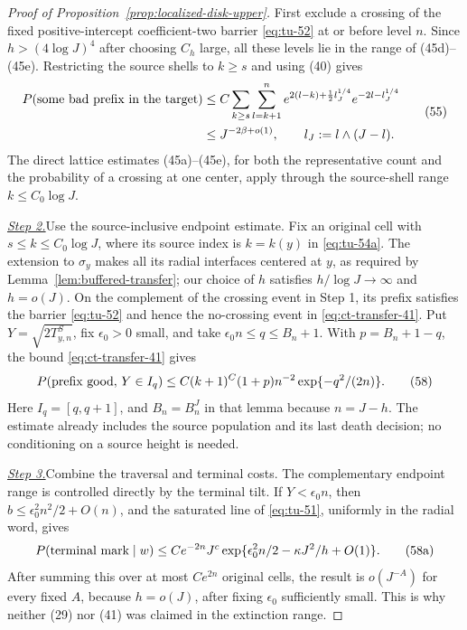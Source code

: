 \begin{proof}[Proof of Proposition~\ref{prop:localized-disk-upper}]
First exclude a crossing of the fixed positive-intercept
coefficient-two barrier \eqref{eq:tu-52} at or before level \(n\).  Since
\(h>(4\log J)^4\) after choosing \(C_h\) large, all these levels lie in
the range of (45d)--(45e).  Restricting the source shells to \(k\ge s\)
and using (40) gives
\begin{equation}
\begin{split}
 P(\hbox{some bad prefix in the target})
 &\le C\sum_{k\ge s}\sum_{l=k+1}^{n}
 e^{2(l-k)+\frac12 l_J^{1/4}}
 e^{-2l-l_J^{1/4}}\\
 &\le J^{-2\beta+o(1)},\qquad
 l_J:=l\wedge(J-l).                                          \end{split}
\tag{55}\label{eq:tu-55}
\end{equation}
The direct lattice estimates (45a)--(45e), for both the representative
count and the probability of a crossing at one center, apply through the
source-shell range \(k\le C_0\log J\).

\smallskip\noindent
\underline{\textit{Step 2.}}\quad Use the source-inclusive endpoint estimate.
Fix an original cell with \(s\le k\le C_0\log J\), where its source index
is \(k=k(y)\) in \eqref{eq:tu-54a}.  The extension to \(\sigma_y\) makes
all its radial interfaces centered at \(y\), as required by
Lemma~\ref{lem:buffered-transfer}; our choice of \(h\) satisfies
\(h/\log J\to\infty\) and \(h=o(J)\).  On the complement of the crossing
event in Step 1, its prefix satisfies the barrier \eqref{eq:tu-52} and
hence the no-crossing event in \eqref{eq:ct-transfer-41}.
Put \(Y=\sqrt{2T^S_{y,n}}\), fix \(\epsilon_0>0\) small, and take
\(\epsilon_0n\le q\le B_n+1\).  With \(p=B_n+1-q\), the bound
\eqref{eq:ct-transfer-41} gives
\begin{equation}
 P(\hbox{prefix good},\,Y\in I_q)
 \le C(k+1)^C(1+p)n^{-2}\exp\{-q^2/(2n)\}.                  \tag{58}\label{eq:tu-58}
\end{equation}
Here \(I_q=[q,q+1]\), and \(B_n=B_n^J\) in that lemma because
\(n=J-h\).  The estimate already includes the source population and its
last death decision; no conditioning on a source height is needed.

\smallskip\noindent
\underline{\textit{Step 3.}}\quad Combine the traversal and terminal costs.
The complementary endpoint range is controlled directly by the terminal
tilt.  If
\(Y<\epsilon_0n\), then \(b\le\epsilon_0^2n^2/2+O(n)\), and the saturated
line of \eqref{eq:tu-51}, uniformly in the radial word, gives
\begin{equation}
 P(\hbox{terminal mark}\mid w)
 \le C e^{-2n}J^c
       \exp\{\epsilon_0^2n/2-\kappa J^2/h+O(1)\}.            \tag{58a}\label{eq:tu-58a-2}
\end{equation}
After summing this over at most \(Ce^{2n}\) original cells, the result is
\(o(J^{-A})\) for every fixed \(A\), because \(h=o(J)\), after fixing
\(\epsilon_0\) sufficiently small.  This is why neither (29) nor (41)
was claimed in the extinction range.


\end{proof}
